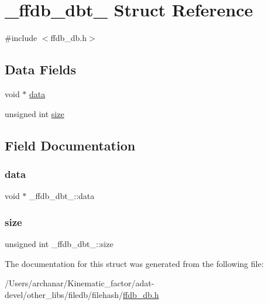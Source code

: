 \hypertarget{struct__ffdb__dbt__}{}\section{\+\_\+ffdb\+\_\+dbt\+\_\+ Struct Reference}
\label{struct__ffdb__dbt__}


{\ttfamily \#include $<$ffdb\+\_\+db.\+h$>$}

\subsection*{Data Fields}
\begin{DoxyCompactItemize}
\item 
void $\ast$ \mbox{\hyperlink{struct__ffdb__dbt___afdd6838a29c80cc996dc48140802feaf}{data}}
\item 
unsigned int \mbox{\hyperlink{struct__ffdb__dbt___a2e25a8697f603a5e7282dbfddbf1be59}{size}}
\end{DoxyCompactItemize}


\subsection{Field Documentation}
\mbox{\label{struct__ffdb__dbt___afdd6838a29c80cc996dc48140802feaf}} 
\subsubsection{\texorpdfstring{data}{data}}
{\footnotesize\ttfamily void $\ast$ \+\_\+ffdb\+\_\+dbt\+\_\+\+::data}

\mbox{\label{struct__ffdb__dbt___a2e25a8697f603a5e7282dbfddbf1be59}} 
\subsubsection{\texorpdfstring{size}{size}}
{\footnotesize\ttfamily unsigned int \+\_\+ffdb\+\_\+dbt\+\_\+\+::size}



The documentation for this struct was generated from the following file\+:\begin{DoxyCompactItemize}
\item 
/\+Users/archanar/\+Kinematic\+\_\+factor/adat-\/devel/other\+\_\+libs/filedb/filehash/\mbox{\hyperlink{adat-devel_2other__libs_2filedb_2filehash_2ffdb__db_8h}{ffdb\+\_\+db.\+h}}\end{DoxyCompactItemize}
